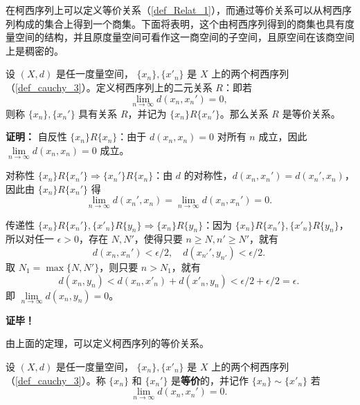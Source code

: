 
在柯西序列上可以定义等价关系（\autoref{def_Relat_1}），而通过等价关系可以从柯西序列构成的集合上得到一个商集。下面将表明，这个由柯西序列得到的商集也具有度量空间的结构，并且原度量空间可看作这一商空间的子空间，且原空间在该商空间上是稠密的。

\begin{theorem}{}
设 $(X,d)$ 是任一度量空间， $\{x_n\},\{x'_n\}$ 是 $X$ 上的两个柯西序列（\autoref{def_cauchy_3}）。定义柯西序列上的二元关系 $R$：即若
\begin{equation}
\lim_{n\rightarrow\infty}d(x_n,x_n')=0,~
\end{equation}
则称 $\{x_n\},\{x_n'\}$ 具有关系 $R$，并记为 $\{x_n\}R\{x_n'\}$。那么关系 $R$ 是等价关系。
\end{theorem}
\textbf{证明：}
自反性 $\{x_n\}R\{x_n\}$：由于 $d(x_n,x_n)=0$ 对所有 $n$ 成立，因此 $\lim\limits_{n\rightarrow\infty}d(x_n,x_n)=0$ 成立。

对称性 $\{x_n\}R\{x_n'\}\Rightarrow\{x_n'\}R\{x_n\}$：由 $d$ 的对称性，$d(x_n,x_n')=d(x_n',x_n)$，因此由 $\{x_n\}R\{x_n'\}$ 得 
\begin{equation}
\lim_{n\rightarrow\infty}d(x_n',x_n)=\lim_{n\rightarrow\infty}d(x_n,x_n')=0.~
\end{equation}

传递性 $\{x_n\}R\{x_n'\},\{x'_n\}R\{y_n\}\Rightarrow\{x_n\}R\{y_n\}$：因为 $\{x_n\}R\{x_n'\},\{x'_n\}R\{y_n\}$，所以对任一 $\epsilon>0$，存在 $N,N'$，使得只要 $n\geq N,n'\geq N'$，就有
\begin{equation}
d(x_n,x_n')<\epsilon/2,\quad d(x_{n'}',y_{n'})<\epsilon/2.~
\end{equation}
取 $N_1=\max\{N,N'\}$，则只要 $n>N_1$，就有
\begin{equation}
d(x_n,y_n)<d(x_n,x'_n)+d(x'_n,y_n)<\epsilon/2+\epsilon/2=\epsilon.~
\end{equation}
即 $\lim\limits_{n\rightarrow\infty}d(x_n,y_n)=0$。

\textbf{证毕！}

由上面的定理，可以定义柯西序列的等价关系。
\begin{definition}{}\label{def_CauEq_1}
设 $(X,d)$ 是任一度量空间， $\{x_n\},\{x'_n\}$ 是 $X$ 上的两个柯西序列（\autoref{def_cauchy_3}）。称 $\{x_n\}$ 和 $\{x_n'\}$ 是\textbf{等价}的，并记作 $\{x_n\}\sim\{x'_n\}$ 若
\begin{equation}
\lim_{n\rightarrow\infty}d(x_n,x_n')=0.~
\end{equation}
\end{definition}

